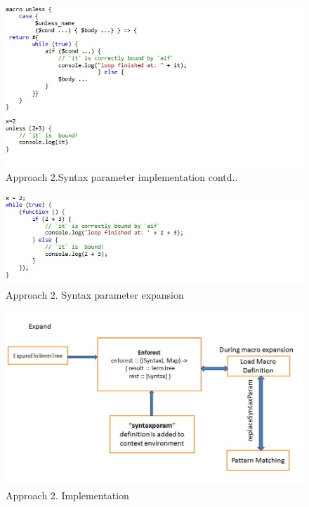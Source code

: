 \begin{figure}[htb]
\centering
\includegraphics[width=1.0\textwidth]{images/Appraoch23.jpg}
\caption{ Approach 2.Syntax parameter implementation contd..} 
\label{fig:AST5}
\end{figure}
 
\begin{figure}[htb]
\centering
\includegraphics[width=1.0\textwidth]{images/Appraoch22.jpg}
\caption{ Approach 2. Syntax parameter expansion} 
\label{fig:AST6}
\end{figure}

\newpage
\begin{figure}[htb]
\centering
\includegraphics[width=1.0\textwidth]{images/CodeWorking.jpg}
\caption{ Approach 2. Implementation } 
\label{fig:AST7}
\end{figure}

